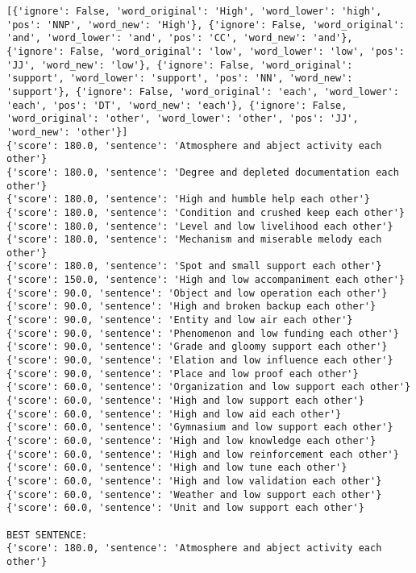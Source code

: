\documentclass[12pt,a4paper,oneside]{book}
\begin{document}
\begin{verbatim}
[{'ignore': False, 'word_original': 'High', 'word_lower': 'high', 'pos': 'NNP', 'word_new': 'High'}, {'ignore': False, 'word_original': 'and', 'word_lower': 'and', 'pos': 'CC', 'word_new': 'and'}, {'ignore': False, 'word_original': 'low', 'word_lower': 'low', 'pos': 'JJ', 'word_new': 'low'}, {'ignore': False, 'word_original': 'support', 'word_lower': 'support', 'pos': 'NN', 'word_new': 'support'}, {'ignore': False, 'word_original': 'each', 'word_lower': 'each', 'pos': 'DT', 'word_new': 'each'}, {'ignore': False, 'word_original': 'other', 'word_lower': 'other', 'pos': 'JJ', 'word_new': 'other'}]
{'score': 180.0, 'sentence': 'Atmosphere and abject activity each other'}
{'score': 180.0, 'sentence': 'Degree and depleted documentation each other'}
{'score': 180.0, 'sentence': 'High and humble help each other'}
{'score': 180.0, 'sentence': 'Condition and crushed keep each other'}
{'score': 180.0, 'sentence': 'Level and low livelihood each other'}
{'score': 180.0, 'sentence': 'Mechanism and miserable melody each other'}
{'score': 180.0, 'sentence': 'Spot and small support each other'}
{'score': 150.0, 'sentence': 'High and low accompaniment each other'}
{'score': 90.0, 'sentence': 'Object and low operation each other'}
{'score': 90.0, 'sentence': 'High and broken backup each other'}
{'score': 90.0, 'sentence': 'Entity and low air each other'}
{'score': 90.0, 'sentence': 'Phenomenon and low funding each other'}
{'score': 90.0, 'sentence': 'Grade and gloomy support each other'}
{'score': 90.0, 'sentence': 'Elation and low influence each other'}
{'score': 90.0, 'sentence': 'Place and low proof each other'}
{'score': 60.0, 'sentence': 'Organization and low support each other'}
{'score': 60.0, 'sentence': 'High and low support each other'}
{'score': 60.0, 'sentence': 'High and low aid each other'}
{'score': 60.0, 'sentence': 'Gymnasium and low support each other'}
{'score': 60.0, 'sentence': 'High and low knowledge each other'}
{'score': 60.0, 'sentence': 'High and low reinforcement each other'}
{'score': 60.0, 'sentence': 'High and low tune each other'}
{'score': 60.0, 'sentence': 'High and low validation each other'}
{'score': 60.0, 'sentence': 'Weather and low support each other'}
{'score': 60.0, 'sentence': 'Unit and low support each other'}

BEST SENTENCE:
{'score': 180.0, 'sentence': 'Atmosphere and abject activity each other'}



\end{verbatim}
\end{document}
